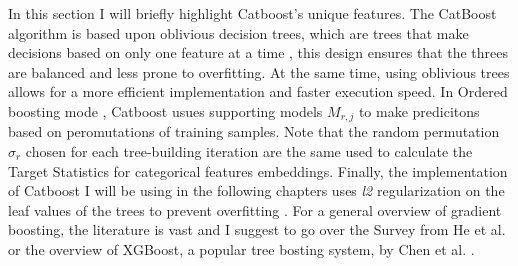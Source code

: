 In this section I will briefly highlight Catboost's unique features. The CatBoost algorithm is based upon oblivious decision trees, which are trees that make decisions based on only one feature at a time \cite{dorogush2018catboost}, this design ensures that the threes are balanced and less prone to overfitting. At the same time, using oblivious trees allows for a more efficient implementation and faster execution speed. In Ordered boosting mode \cite{dorogush2018catboost}, Catboost usues supporting models $M_{r,j}$ to make predicitons based on peromutations of training samples. Note that the random permutation $\sigma_r$ chosen for each tree-building iteration are the same used to calculate the Target Statistics for categorical features embeddings. Finally, the implementation of Catboost I will be using in the following chapters uses \textit{l2} regularization on the leaf values of the trees to prevent overfitting \cite{dorogush2018catboost,prokhorenkova2018catboost}. For a general overview of gradient boosting, the literature is vast and I suggest to go over the Survey from He et al. \cite{he2019gradient} or the overview of XGBoost, a popular tree bosting system, by Chen et al. \cite{Chen_2016}. 






